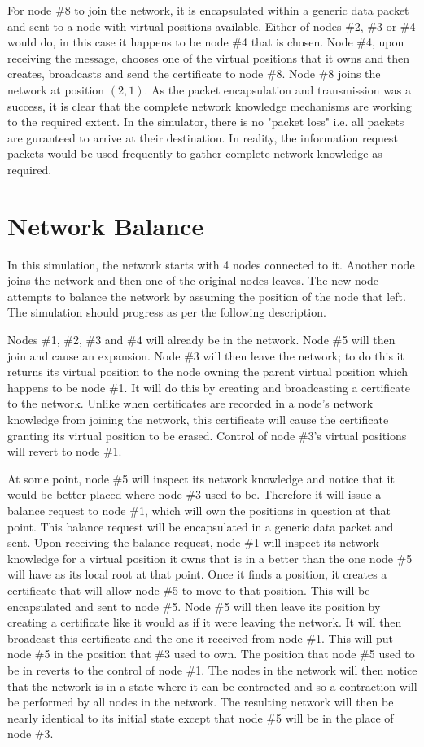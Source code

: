 \documentclass[ %
                    author={Luke Murray},
                supervisor={Dr. Simon Hollis},
                     title={Shadow Peer-to-Peer Networks},
                  subtitle={},
                    degree={MEng},
                      year={2013} ]{thesis}
\begin{document}
For node \#8 to join the network, it is encapsulated within a generic data packet and sent to a node with virtual positions available. Either of nodes \#2, \#3 or \#4 would do, in this case it happens to be node \#4 that is chosen. Node \#4, upon receiving the message, chooses one of the virtual positions that it owns and then creates, broadcasts and send the certificate to node \#8. Node \#8 joins the network at position $(2, 1)$. As the packet encapsulation and transmission was a success, it is clear that the complete network knowledge mechanisms are working to the required extent. In the simulator, there is no "packet loss" i.e. all packets are guranteed to arrive at their destination. In reality, the information request packets would be used frequently to gather complete network knowledge as required.

\section{Network Balance}

In this simulation, the network starts with 4 nodes connected to it. Another node joins the network and then one of the original nodes leaves. The new node attempts to balance the network by assuming the position of the node that left. The simulation should progress as per the following description.

Nodes \#1, \#2, \#3 and \#4 will already be in the network. Node \#5 will then join and cause an expansion. Node \#3 will then leave the network; to do this it returns its virtual position to the node owning the parent virtual position which happens to be node \#1. It will do this by creating and broadcasting a certificate to the network. Unlike when certificates are recorded in a node's network knowledge from joining the network, this certificate will cause the certificate granting its virtual position to be erased. Control of node \#3's virtual positions will revert to node \#1.

At some point, node \#5 will inspect its network knowledge and notice that it would be better placed where node \#3 used to be. Therefore it will issue a balance request to node \#1, which will own the positions in question at that point. This balance request will be encapsulated in a generic data packet and sent. Upon receiving the balance request, node \#1 will inspect its network knowledge for a virtual position it owns that is in a better than the one node \#5 will have as its local root at that point. Once it finds a position, it creates a certificate that will allow node \#5 to move to that position. This will be encapsulated and sent to node \#5. Node \#5 will then leave its position by creating a certificate like it would as if it were leaving the network. It will then broadcast this certificate and the one it received from node \#1. This will put node \#5 in the position that \#3 used to own. The position that node \#5 used to be in reverts to the control of node \#1. The nodes in the network will then notice that the network is in a state where it can be contracted and so a contraction will be performed by all nodes in the network. The resulting network will then be nearly identical to its initial state except that node \#5 will be in the place of node \#3.
\end{document}
